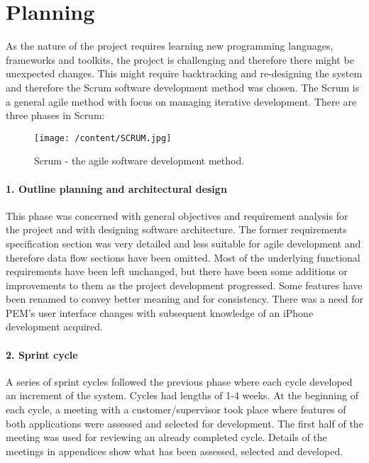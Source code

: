 \documentclass[12pt, a4paper]{report}   %
\begin{document}
\chapter{Planning}
As the nature of the project requires learning new programming languages, frameworks and toolkits, the project is challenging and therefore there might be unexpected changes. This might require backtracking and re-designing the system and therefore the Scrum software development method was chosen. The Scrum is a general agile method with focus on managing iterative development. There are three phases in Scrum:\\


\begin{figure}[H]
  \centering
	\texttt{[image: /content/SCRUM.jpg]}\\
	  \caption{Scrum - the agile software development method.}
\end{figure}


\subsubsection{1. Outline planning and architectural design}
This phase was concerned with general objectives and requirement analysis for the project and with designing software architecture. The former requirements specification section was very detailed and less suitable for agile development and therefore data flow sections have been omitted. Most of the underlying functional requirements have been left unchanged, but there have been some additions or improvements to them as the project development progressed. Some features have been renamed to convey better meaning and for consistency. There was a need for PEM's user interface changes with subsequent knowledge of an iPhone development acquired.


\subsubsection{2. Sprint cycle}
A series of sprint cycles followed the previous phase where each cycle developed an increment of the system. Cycles had lengths of 1-4 weeks. At the beginning of each cycle, a meeting with a customer/supervisor took place where features of both applications were assessed and selected for development. The first half of the meeting was used for reviewing an already completed cycle. Details of the meetings in appendices show what has been assessed, selected and developed.
\end{document}
